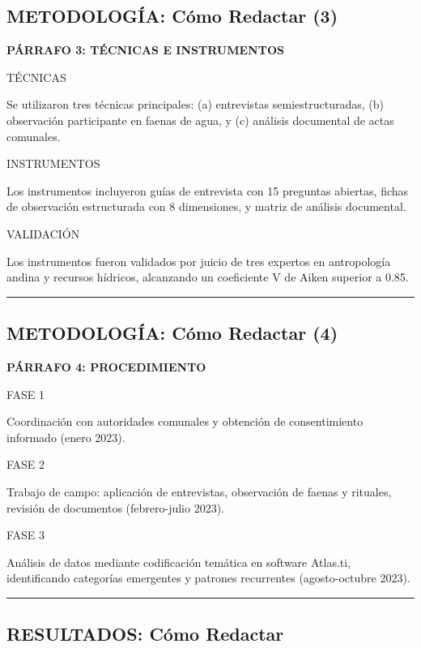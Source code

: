 \documentclass[
  11pt,
]{beaner}
\begin{document}
\subsection{METODOLOGÍA: Cómo Redactar
(3)}\label{metodologuxeda-cuxf3mo-redactar-3}

\textbf{PÁRRAFO 3: TÉCNICAS E INSTRUMENTOS}

{TÉCNICAS}

Se utilizaron tres técnicas principales: (a) entrevistas
semiestructuradas, (b) observación participante en faenas de agua, y (c)
análisis documental de actas comunales.

{INSTRUMENTOS}

Los instrumentos incluyeron guías de entrevista con 15 preguntas
abiertas, fichas de observación estructurada con 8 dimensiones, y matriz
de análisis documental.

{VALIDACIÓN}

Los instrumentos fueron validados por juicio de tres expertos en
antropología andina y recursos hídricos, alcanzando un coeficiente V de
Aiken superior a 0.85.

\begin{center}\rule{0.5\linewidth}{0.5pt}\end{center}

\subsection{METODOLOGÍA: Cómo Redactar
(4)}\label{metodologuxeda-cuxf3mo-redactar-4}

\textbf{PÁRRAFO 4: PROCEDIMIENTO}

{FASE 1}

Coordinación con autoridades comunales y obtención de consentimiento
informado (enero 2023).

{FASE 2}

Trabajo de campo: aplicación de entrevistas, observación de faenas y
rituales, revisión de documentos (febrero-julio 2023).

{FASE 3}

Análisis de datos mediante codificación temática en software Atlas.ti,
identificando categorías emergentes y patrones recurrentes
(agosto-octubre 2023).

\begin{center}\rule{0.5\linewidth}{0.5pt}\end{center}

\subsection{RESULTADOS: Cómo
Redactar}\label{resultados-cuxf3mo-redactar}
\end{document}
